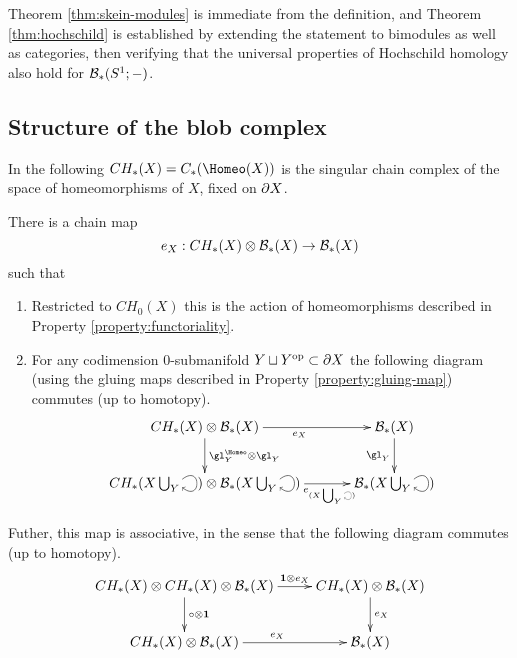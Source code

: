 \documentclass{pnastwo}
\begin{document}
\begin{article}
Theorem \ref{thm:skein-modules} is immediate from the definition, and
Theorem \ref{thm:hochschild} is established by extending the statement to bimodules as well as categories, then verifying that the universal properties of Hochschild homology also hold for ${\mathcal B}_*(S^1; -)$.


\subsection{Structure of the blob complex}
\label{sec:structure}

In the following $\CH{X} = C_*(\Homeo(X))$ is the singular chain complex of the space of homeomorphisms of $X$, fixed on $\partial X$.

\begin{thm}
\label{thm:CH}\label{thm:evaluation}
There is a chain map
\begin{equation*}
e_X: CH_*(X) \otimes {\mathcal B}_*(X) \to {\mathcal B}_*(X)
\end{equation*}
such that
\begin{enumerate}
\item Restricted to $CH_0(X)$ this is the action of homeomorphisms described in Property \ref{property:functoriality}. 

\item For
any codimension $0$-submanifold $Y \sqcup Y^\text{op} \subset \partial X$ the following diagram
(using the gluing maps described in Property \ref{property:gluing-map}) commutes (up to homotopy).
\begin{equation*}
\xymatrix@C+0.3cm{
     \CH{X} \otimes \bc_*(X)
        \ar[r]_{e_{X}}  \ar[d]^{\gl^{\Homeo}_Y \otimes \gl_Y}  &
            \bc_*(X) \ar[d]_{\gl_Y} \\
     \CH{X \bigcup_Y \selfarrow} \otimes \bc_*(X \bigcup_Y \selfarrow) \ar[r]_<<<<<<<{e_{(X \bigcup_Y \scalebox{0.5}{\selfarrow})}}    & \bc_*(X \bigcup_Y \selfarrow)
}
\end{equation*}
\end{enumerate}

Futher, this map is associative, in the sense that the following diagram commutes (up to homotopy).
\begin{equation*}
\xymatrix{
\CH{X} \tensor \CH{X} \tensor \bc_*(X) \ar[r]^<<<<<{\id \tensor e_X} \ar[d]^{\compose \tensor \id} & \CH{X} \tensor \bc_*(X) \ar[d]^{e_X} \\
\CH{X} \tensor \bc_*(X) \ar[r]^{e_X} & \bc_*(X)
}
\end{equation*}
\end{thm}


\end{article}
\end{document}

